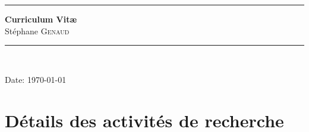 \documentclass[11pt]{article}
\begin{document}
\setlength{\parindent}{0mm}



\rule{\linewidth}{1mm}
\begin{center}
\Large{\textbf{Curriculum Vit{\ae}}}\\[5mm]
\Large{Stéphane \textsc{Genaud}}\\[1cm]

\rule{\linewidth}{1mm}
\\
\vspace{3cm}
\end{center}
\begin{center}
Date: \today\\
\end{center}

\newpage
\mbox{}%

\setlength{\parindent}{5mm} %








\section{Détails des activités de recherche}
\end{document}
